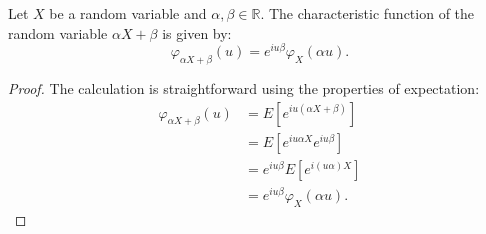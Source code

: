 \begin{proposition}
Let $X$ be a random variable and $\alpha, \beta \in \mathbb{R}$. The characteristic function of the random variable $\alpha X + \beta$ is given by:
\[ \varphi_{\alpha X + \beta}(u) = e^{iu\beta} \varphi_X(\alpha u). \]
\end{proposition}%
\begin{proof}
The calculation is straightforward using the properties of expectation:
\begin{align*}
\varphi_{\alpha X + \beta}(u) &= E[e^{iu(\alpha X + \beta)}] \\
&= E[e^{iu\alpha X} e^{iu\beta}] \\
&= e^{iu\beta} E[e^{i(u\alpha)X}] \\
&= e^{iu\beta} \varphi_X(\alpha u).
\end{align*}
\end{proof}%
